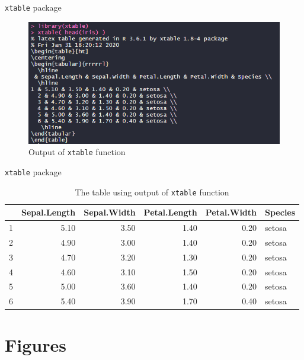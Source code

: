 \documentclass{beamer}
\begin{document}
\begin{frame}{\texttt{xtable} package}
	\begin{figure}[h] %
		\begin{center}
			\includegraphics[width=0.9\linewidth]{img/xtable2.png}
		\end{center}
		\caption{Output of \texttt{xtable} function}
		\label{fig:long}
		\label{fig:onecol}
	\end{figure}
\end{frame}

\begin{frame}{\texttt{xtable} package}
	\begin{table}[ht]
		\centering
		\tiny
		\begin{tabular}{rrrrrl}
			\hline
			& Sepal.Length & Sepal.Width & Petal.Length & Petal.Width & Species \\ 
			\hline
			1 & 5.10 & 3.50 & 1.40 & 0.20 & setosa \\ 
			2 & 4.90 & 3.00 & 1.40 & 0.20 & setosa \\ 
			3 & 4.70 & 3.20 & 1.30 & 0.20 & setosa \\ 
			4 & 4.60 & 3.10 & 1.50 & 0.20 & setosa \\ 
			5 & 5.00 & 3.60 & 1.40 & 0.20 & setosa \\ 
			6 & 5.40 & 3.90 & 1.70 & 0.40 & setosa \\ 
			\hline
		\end{tabular}
		\caption{The table using output of \texttt{xtable} function}
	\end{table}
\end{frame}


\section{Figures}
\end{document}
